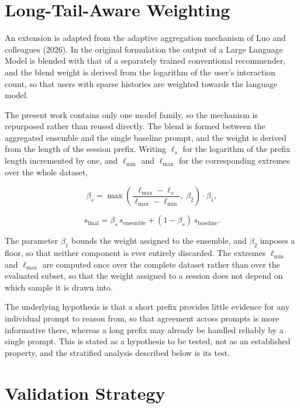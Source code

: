 \documentclass[12pt,a4paper,oneside]{report}
\begin{document}
\section{Long-Tail-Aware Weighting}

An extension is adapted from the adaptive aggregation mechanism of Luo and
colleagues (2026). In the original formulation the output of a Large Language
Model is blended with that of a separately trained conventional recommender, and
the blend weight is derived from the logarithm of the user's interaction count,
so that users with sparse histories are weighted towards the language model.

The present work contains only one model family, so the mechanism is repurposed
rather than reused directly. The blend is formed between the aggregated ensemble
and the single baseline prompt, and the weight is derived from the length of the
session prefix. Writing $\ell_s$ for the logarithm of the prefix length
incremented by one, and $\ell_{\min}$ and $\ell_{\max}$ for the corresponding
extremes over the whole dataset,

\begin{equation}
\beta_s = \max\!\left(\frac{\ell_{\max} - \ell_s}{\ell_{\max} - \ell_{\min}},\;
\beta_2\right)\cdot \beta_1,
\end{equation}

\begin{equation}
s_{\text{final}} = \beta_s \, s_{\text{ensemble}} + (1 - \beta_s)\,
s_{\text{baseline}} .
\end{equation}

The parameter $\beta_1$ bounds the weight assigned to the ensemble, and
$\beta_2$ imposes a floor, so that neither component is ever entirely
discarded. The extremes $\ell_{\min}$ and $\ell_{\max}$ are computed once over
the complete dataset rather than over the evaluated subset, so that the weight
assigned to a session does not depend on which sample it is drawn into.

The underlying hypothesis is that a short prefix provides little evidence for
any individual prompt to reason from, so that agreement across prompts is more
informative there, whereas a long prefix may already be handled reliably by a
single prompt. This is stated as a hypothesis to be tested, not as an
established property, and the stratified analysis described below is its test.

\section{Validation Strategy}
\end{document}

